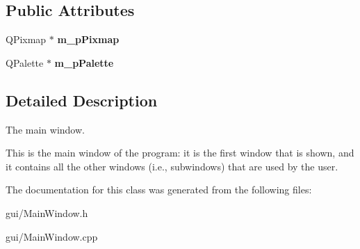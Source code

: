 \subsection*{Public Attributes}
\begin{DoxyCompactItemize}
\item 
\mbox{\label{classMainWindow_a0df1000428a75f4b5ca749b84f1f4a28}} 
Q\+Pixmap $\ast$ {\bfseries m\+\_\+p\+Pixmap}
\item 
\mbox{\label{classMainWindow_a4687ca985e01079dd109899fa997b5ef}} 
Q\+Palette $\ast$ {\bfseries m\+\_\+p\+Palette}
\end{DoxyCompactItemize}


\subsection{Detailed Description}
The main window. 

This is the main window of the program\+: it is the first window that is shown, and it contains all the other windows (i.\+e., subwindows) that are used by the user. 

The documentation for this class was generated from the following files\+:\begin{DoxyCompactItemize}
\item 
gui/Main\+Window.\+h\item 
gui/Main\+Window.\+cpp\end{DoxyCompactItemize}
